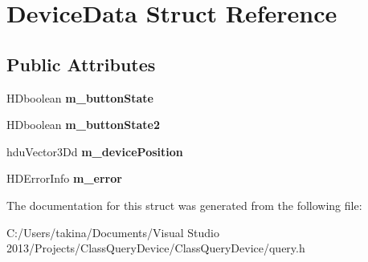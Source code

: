 \hypertarget{struct_device_data}{}\section{Device\+Data Struct Reference}
\label{struct_device_data}
\subsection*{Public Attributes}
\begin{DoxyCompactItemize}
\item 
\hypertarget{struct_device_data_a51cd9a935aae6de0cea0093c22ef866a}{}\label{struct_device_data_a51cd9a935aae6de0cea0093c22ef866a} 
H\+Dboolean {\bfseries m\+\_\+button\+State}
\item 
\hypertarget{struct_device_data_a603d7c3fe0ac7682f685bbc0ba814367}{}\label{struct_device_data_a603d7c3fe0ac7682f685bbc0ba814367} 
H\+Dboolean {\bfseries m\+\_\+button\+State2}
\item 
\hypertarget{struct_device_data_a0573c42673345d1148d8f0c56bc5c442}{}\label{struct_device_data_a0573c42673345d1148d8f0c56bc5c442} 
hdu\+Vector3\+Dd {\bfseries m\+\_\+device\+Position}
\item 
\hypertarget{struct_device_data_a18b9f4cc612ff238f79ac852e7be725d}{}\label{struct_device_data_a18b9f4cc612ff238f79ac852e7be725d} 
H\+D\+Error\+Info {\bfseries m\+\_\+error}
\end{DoxyCompactItemize}


The documentation for this struct was generated from the following file\+:\begin{DoxyCompactItemize}
\item 
C\+:/\+Users/takina/\+Documents/\+Visual Studio 2013/\+Projects/\+Class\+Query\+Device/\+Class\+Query\+Device/query.\+h\end{DoxyCompactItemize}
